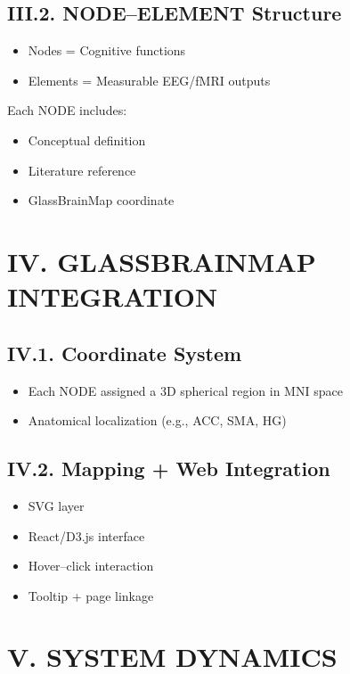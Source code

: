 \subsection*{III.2. NODE–ELEMENT Structure}

\begin{itemize}
    \item Nodes = Cognitive functions
    \item Elements = Measurable EEG/fMRI outputs
\end{itemize}

Each NODE includes:

\begin{itemize}
    \item Conceptual definition
    \item Literature reference
    \item GlassBrainMap coordinate
\end{itemize}

\section*{IV. GLASSBRAINMAP INTEGRATION}

\subsection*{IV.1. Coordinate System}

\begin{itemize}
    \item Each NODE assigned a 3D spherical region in MNI space
    \item Anatomical localization (e.g., ACC, SMA, HG)
\end{itemize}

\subsection*{IV.2. Mapping + Web Integration}

\begin{itemize}
    \item SVG layer
    \item React/D3.js interface
    \item Hover–click interaction
    \item Tooltip + page linkage
\end{itemize}

\section*{V. SYSTEM DYNAMICS}

